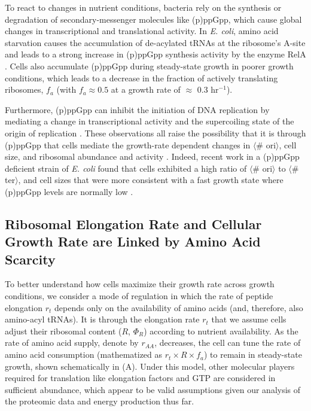 To react to changes in nutrient conditions, bacteria rely on the synthesis or
degradation of secondary-messenger molecules  like (p)ppGpp, which cause global
changes in transcriptional and translational activity. In \textit{E. coli},
amino acid starvation causes the accumulation of de-acylated tRNAs at the
ribosome's A-site and leads to a strong increase in (p)ppGpp synthesis activity
by the enzyme RelA \citep{hauryliuk2015}. Cells also accumulate (p)ppGpp  during
steady-state growth in poorer growth conditions, which leads to a decrease in
the fraction of actively translating ribosomes, $f_a$  (with $f_a \approx 0.5$
at a growth rate of $\approx$ 0.3 hr$^{-1}$).

Furthermore, (p)ppGpp can inhibit the initiation of DNA replication by mediating
a change in transcriptional activity and the supercoiling state of the origin of
replication \citep{kraemer2019}. These observations all raise the possibility
that it is through (p)ppGpp that cells mediate the growth-rate dependent changes
in $\langle$\# ori$\rangle$, cell size, and ribosomal abundance and activity
\citep{zhu2019, Buke2020}. Indeed, recent work in a (p)ppGpp deficient strain of
\textit{E. coli} found that cells exhibited a high ratio of $\langle$\#
ori$\rangle$ to $\langle$\# ter$\rangle$, and cell sizes that were more
consistent with a fast growth state where (p)ppGpp levels are normally low
\citep{fernandezcoll2020}.

\subsection{Ribosomal Elongation Rate and Cellular Growth Rate are Linked by
Amino Acid Scarcity}
To better understand how cells maximize their growth rate across growth
conditions, we consider a mode of regulation in which the rate of peptide
elongation $r_t$ depends only on the availability of amino acids (and,
therefore, also amino-acyl tRNAs). It is through the elongation rate $r_t$ that
we assume cells adjust their ribosomal content ($R$, $\Phi_R$) according to
nutrient availability.  As the rate of amino acid supply, denote by $r_{AA}$,
decreases, the cell can tune the  rate of amino acid consumption (mathematized
as $r_t \times R \times f_a$) to remain in steady-state growth, shown
schematically in (A). Under this model,
other molecular players required for translation like elongation factors and GTP
are considered in sufficient abundance, which appear to be valid assumptions
given our analysis of the proteomic data and energy production thus far.

